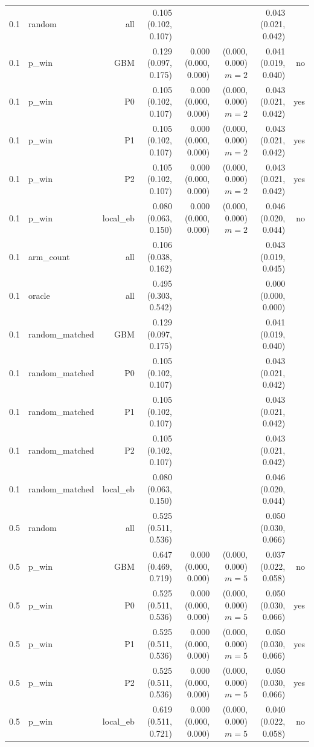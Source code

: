 \begin{tabular}{llrrrrrr}
0.1 & random & all & 0.105 (0.102, 0.107) &  &  & 0.043 (0.021, 0.042) &  \\
0.1 & p\_win & GBM & 0.129 (0.097, 0.175) & 0.000 (0.000, 0.000) & (0.000, 0.000) $m=2$ & 0.041 (0.019, 0.040) & no \\
0.1 & p\_win & P0 & 0.105 (0.102, 0.107) & 0.000 (0.000, 0.000) & (0.000, 0.000) $m=2$ & 0.043 (0.021, 0.042) & yes \\
0.1 & p\_win & P1 & 0.105 (0.102, 0.107) & 0.000 (0.000, 0.000) & (0.000, 0.000) $m=2$ & 0.043 (0.021, 0.042) & yes \\
0.1 & p\_win & P2 & 0.105 (0.102, 0.107) & 0.000 (0.000, 0.000) & (0.000, 0.000) $m=2$ & 0.043 (0.021, 0.042) & yes \\
0.1 & p\_win & local\_eb & 0.080 (0.063, 0.150) & 0.000 (0.000, 0.000) & (0.000, 0.000) $m=2$ & 0.046 (0.020, 0.044) & no \\
0.1 & arm\_count & all & 0.106 (0.038, 0.162) &  &  & 0.043 (0.019, 0.045) &  \\
0.1 & oracle & all & 0.495 (0.303, 0.542) &  &  & 0.000 (0.000, 0.000) &  \\
0.1 & random\_matched & GBM & 0.129 (0.097, 0.175) &  &  & 0.041 (0.019, 0.040) &  \\
0.1 & random\_matched & P0 & 0.105 (0.102, 0.107) &  &  & 0.043 (0.021, 0.042) &  \\
0.1 & random\_matched & P1 & 0.105 (0.102, 0.107) &  &  & 0.043 (0.021, 0.042) &  \\
0.1 & random\_matched & P2 & 0.105 (0.102, 0.107) &  &  & 0.043 (0.021, 0.042) &  \\
0.1 & random\_matched & local\_eb & 0.080 (0.063, 0.150) &  &  & 0.046 (0.020, 0.044) &  \\
0.5 & random & all & 0.525 (0.511, 0.536) &  &  & 0.050 (0.030, 0.066) &  \\
0.5 & p\_win & GBM & 0.647 (0.469, 0.719) & 0.000 (0.000, 0.000) & (0.000, 0.000) $m=5$ & 0.037 (0.022, 0.058) & no \\
0.5 & p\_win & P0 & 0.525 (0.511, 0.536) & 0.000 (0.000, 0.000) & (0.000, 0.000) $m=5$ & 0.050 (0.030, 0.066) & yes \\
0.5 & p\_win & P1 & 0.525 (0.511, 0.536) & 0.000 (0.000, 0.000) & (0.000, 0.000) $m=5$ & 0.050 (0.030, 0.066) & yes \\
0.5 & p\_win & P2 & 0.525 (0.511, 0.536) & 0.000 (0.000, 0.000) & (0.000, 0.000) $m=5$ & 0.050 (0.030, 0.066) & yes \\
0.5 & p\_win & local\_eb & 0.619 (0.511, 0.721) & 0.000 (0.000, 0.000) & (0.000, 0.000) $m=5$ & 0.040 (0.022, 0.058) & no \\

\end{tabular}
